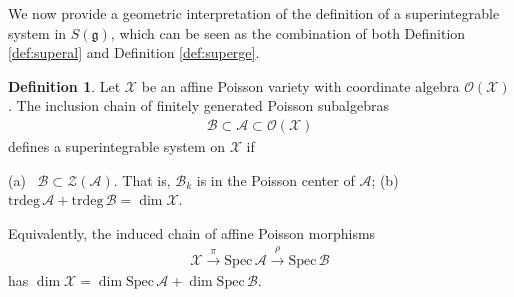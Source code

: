 \documentclass[11pt,reqno]{amsart}
\newtheorem*{theorem A}{Main Theorem A}
\newtheorem*{theorem B}{Main Theorem B}
\newtheorem*{theorem C}{Main Theorem C}
\newtheorem*{theorem D}{Main Theorem D}
\theoremstyle{definition}
\newtheorem{definition}[theorem]{Definition}
\theoremstyle{plain}
\newtheorem{remark}[theorem]{Remark}
\theoremstyle{conclusion}
\begin{document}
 





We now provide a geometric interpretation of the definition of a superintegrable system in $S(\mathfrak{g})$, which can be seen as the combination of both Definition \ref{def:superal} and Definition \ref{def:superge}. 

\begin{definition}
\label{def:superalge}
Let $\mathcal{X}$ be an affine Poisson variety with coordinate algebra $\mathcal{O}(\mathcal{X})$. The inclusion chain of   finitely generated Poisson subalgebras \begin{align*}
\mathcal{B}\subset \mathcal{A}\subset \mathcal{O}(\mathcal{X})
\end{align*} defines a superintegrable system on $\mathcal{X}$ if \begin{center}
    (a) \  $\mathcal{B}\subset \mathcal{Z}(\mathcal{A})$. That is,  $\mathcal{B}_k$ is in the Poisson center of $\mathcal{A}$;  \quad (b) \  $\mathrm{trdeg} \,\mathcal{A}+\mathrm{trdeg} \,\mathcal{B}=\dim \mathcal{X}$.
\end{center}   Equivalently, the induced chain of affine Poisson morphisms \begin{align*}
\mathcal{X} \xrightarrow{\ \pi\ } \mathrm{Spec} \,\mathcal{A} \xrightarrow{\ \rho\ } \mathrm{Spec}\,\mathcal{B}
\end{align*} has $\dim \mathcal{X}=\dim\mathrm{Spec}\,\mathcal{A}+\dim\mathrm{Spec}\,\mathcal{B}$.
\end{definition}
\end{document}
